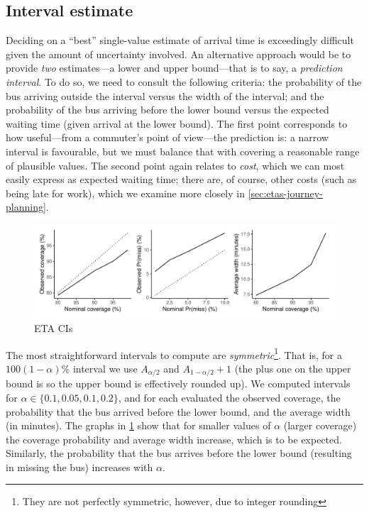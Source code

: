\subsection{Interval estimate}
\label{sec:etas-interval}


Deciding on a ``best'' single-value estimate of arrival time is exceedingly difficult given the amount of uncertainty involved. An alternative approach would be to provide \emph{two} estimates---a lower and upper bound---that is to say, a \emph{prediction interval}. To do so, we need to consult the following criteria:
the probability of the bus arriving outside the interval versus the width of the interval; and
the probability of the bus arriving before the lower bound versus the expected waiting time (given arrival at the lower bound).
The first point corresponds to how useful---from a commuter's point of view---the prediction is: a narrow interval is favourable, but we must balance that with covering a reasonable range of plausible values. The second point again relates to \emph{cost}, which we can most easily express as expected waiting time; there are, of course, other costs (such as being late for work), which we examine more closely in \cref{sec:etas-journey-planning}.







\begin{knitrout}
\color{fgcolor}\begin{figure}

{\centering \includegraphics[width=\textwidth]{figure/eta_cis-1} 

}

\caption[ETA CIs]{ETA CIs}\label{fig:eta_cis}
\end{figure}


\end{knitrout}


The most straightforward intervals to compute are \emph{symmetric}\footnote{They are not perfectly symmetric, however, due to integer rounding}. That is, for a \mbox{$100(1-\alpha)$\%} interval we use $A_{\alpha/2}$ and $A_{1-\alpha/2} + 1$ (the plus one on the upper bound is so the upper bound is effectively rounded up). We computed intervals for $\alpha \in \{0.1, 0.05, 0.1, 0.2\}$, and for each evaluated the observed coverage, the probability that the bus arrived before the lower bound, and the average width (in minutes). The graphs in \cref{fig:eta_cis} show that for smaller values of $\alpha$ (larger coverage) the coverage probability and average width increase, which is to be expected. Similarly, the probability that the bus arrives before the lower bound (resulting in missing the bus) increases with $\alpha$.

